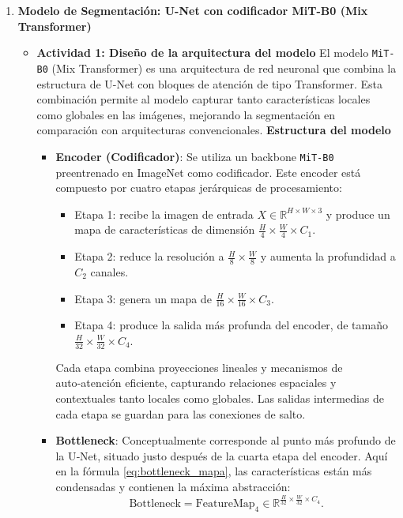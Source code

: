 \begin{enumerate}
\begin{itemize}
  \end{itemize}
  \item \textbf{Modelo de Segmentación: U-Net con codificador MiT-B0 (Mix Transformer)}
  \begin{itemize}
  \item\textbf{Actividad 1: Diseño de la arquitectura del modelo}
  El modelo \texttt{MiT-B0} (Mix Transformer) es una arquitectura de red neuronal que combina la estructura de U-Net con bloques de atención de tipo Transformer. Esta combinación permite al modelo capturar tanto características locales como globales en las imágenes, mejorando la segmentación en comparación con arquitecturas convencionales.
\textbf{Estructura del modelo}
\begin{itemize}
  \item \textbf{Encoder (Codificador)}:  
    Se utiliza un backbone \texttt{MiT-B0} preentrenado en ImageNet como codificador. Este encoder está compuesto por cuatro etapas jerárquicas de procesamiento:
    \begin{itemize}
      \item Etapa 1: recibe la imagen de entrada $X\in\mathbb{R}^{H\times W\times3}$ y produce un mapa de características de dimensión $\frac{H}{4}\times\frac{W}{4}\times C_1$.
      \item Etapa 2: reduce la resolución a $\frac{H}{8}\times\frac{W}{8}$ y aumenta la profundidad a $C_2$ canales.
      \item Etapa 3: genera un mapa de $\frac{H}{16}\times\frac{W}{16}\times C_3$.
      \item Etapa 4: produce la salida más profunda del encoder, de tamaño $\frac{H}{32}\times\frac{W}{32}\times C_4$.
    \end{itemize}
    Cada etapa combina proyecciones lineales y mecanismos de auto‑atención eficiente, capturando relaciones espaciales y contextuales tanto locales como globales. Las salidas intermedias de cada etapa se guardan para las conexiones de salto.

  \item \textbf{Bottleneck}:  
    Conceptualmente corresponde al punto más profundo de la U‑Net, situado justo después de la cuarta etapa del encoder. Aquí en la fórmula \ref{eq:bottleneck_mapa}, las características están más condensadas y contienen la máxima abstracción:
    \begin{equation}\label{eq:bottleneck_mapa}
      \text{Bottleneck} = \text{FeatureMap}_{4} \in \mathbb{R}^{\frac{H}{32}\times\frac{W}{32}\times C_4}.
  \end{equation}


\end{itemize}
\end{itemize}
\end{enumerate}
